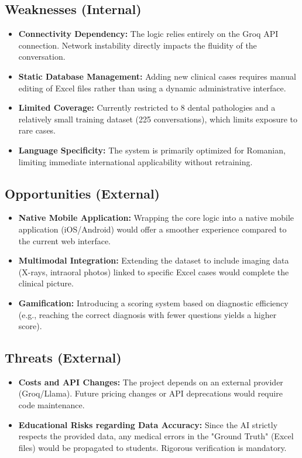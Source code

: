 \documentclass[runningheads,a4paper,11pt]{report}
\begin{document}
\subsection{Weaknesses (Internal)}
\begin{itemize}
    \item \textbf{Connectivity Dependency:} The logic relies entirely on the Groq API connection. Network instability directly impacts the fluidity of the conversation.
    \item \textbf{Static Database Management:} Adding new clinical cases requires manual editing of Excel files rather than using a dynamic administrative interface.
    \item \textbf{Limited Coverage:} Currently restricted to 8 dental pathologies and a relatively small training dataset (225 conversations), which limits exposure to rare cases.
    \item \textbf{Language Specificity:} The system is primarily optimized for Romanian, limiting immediate international applicability without retraining.
\end{itemize}

\subsection{Opportunities (External)}
\begin{itemize}
    \item \textbf{Native Mobile Application:} Wrapping the core logic into a native mobile application (iOS/Android) would offer a smoother experience compared to the current web interface.
    \item \textbf{Multimodal Integration:} Extending the dataset to include imaging data (X-rays, intraoral photos) linked to specific Excel cases would complete the clinical picture.
    \item \textbf{Gamification:} Introducing a scoring system based on diagnostic efficiency (e.g., reaching the correct diagnosis with fewer questions yields a higher score).
\end{itemize}

\subsection{Threats (External)}
\begin{itemize}
    \item \textbf{Costs and API Changes:} The project depends on an external provider (Groq/Llama). Future pricing changes or API deprecations would require code maintenance.
    \item \textbf{Educational Risks regarding Data Accuracy:} Since the AI strictly respects the provided data, any medical errors in the "Ground Truth" (Excel files) would be propagated to students. Rigorous verification is mandatory.
\end{itemize}
\end{document}
